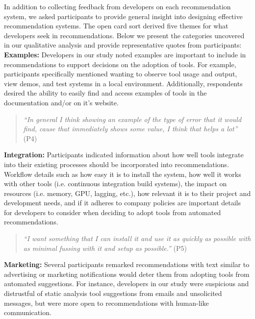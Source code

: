 In addition to collecting feedback from developers on each recommendation system, we asked participants to provide general insight into designing effective recommendation systems. The open card sort derived five themes for what developers seek in recommendations. Below we present the categories uncovered in our qualitative analysis and provide representative quotes from participants: \\

\textbf{Examples:} Developers in our study noted examples are important to include in recommendations to support decisions on the adoption of tools. For example, participants specifically mentioned wanting to observe tool usage and output, view demos, and test systems in a local environment. Additionally, respondents desired the ability to easily find and access examples of tools in the documentation and/or on it's website.

\begin{quote}
\textit{``In general I think showing an example of the type of error that it would find, cause that immediately shows some value, I think that helps a lot''} (P4)
\end{quote}

\textbf{Integration:} Participants indicated information about how well tools integrate into their existing processes should be incorporated into recommendations. Workflow details such as how easy it is to install the system, how well it works with other tools (i.e. continuous integration build systems), the impact on resources (i.e. memory, GPU, lagging, etc.), how relevant it is to their project and development needs, and if it adheres to company policies are important details for developers to consider when deciding to adopt tools from automated recommendations.

\begin{quote}
\textit{``I want something that I can install it and use it as quickly as possible with as minimal fussing with it and setup as possible.''} (P5)
\end{quote}

\textbf{Marketing:} Several participants remarked recommendations with text similar to advertising or marketing notifications would deter them from adopting tools from automated suggestions. For instance, developers in our study were suspicious and distrustful of static analysis tool suggestions from emails and unsolicited messages, but were more open to recommendations with human-like communication.

